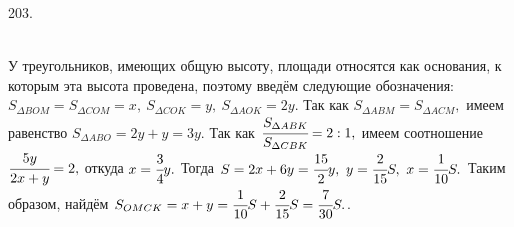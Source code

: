 \documentclass[12pt]{article}
\begin{document}
203. \begin{figure}[ht!]
\end{figure}\\
У треугольников, имеющих общую высоту, площади относятся как основания, к которым эта высота проведена, поэтому введём следующие обозначения: $S_{\Delta BOM}=S_{\Delta COM}=x,\ S_{\Delta COK}=y,\ S_{\Delta AOK}=2y.$ Так как $S_{\Delta ABM}=S_{\Delta ACM},$ имеем равенство $S_{\Delta ABO}=2y+y=3y.$
Так как $\cfrac{S_{\Delta ABK}}{S_{\Delta CBK}}=2:1,$ имеем соотношение
$\cfrac{5y}{2x+y}=2,$ откуда $x=\cfrac{3}{4}y.$ Тогда $S=2x+6y=\cfrac{15}{2}y,\ y=\cfrac{2}{15}S,\ x=\cfrac{1}{10}S.$ Таким образом, найдём
$S_{OMCK}=x+y=\cfrac{1}{10}S+\cfrac{2}{15}S=\cfrac{7}{30}S.$\newpage{}. \begin{figure}[ht!]
\end{figure}\\
\end{document}
